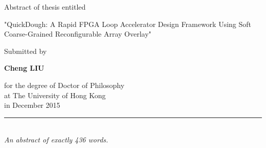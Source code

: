 
\begin{center}
\small Abstract of thesis entitled

\LARGE "QuickDough: A Rapid FPGA Loop Accelerator Design Framework Using Soft Coarse-Grained
Reconfigurable Array Overlay"

\vspace{5mm}
\small Submitted by 

\large \textbf{Cheng LIU}

\vspace{5mm}
for the degree of Doctor of Philosophy \\
at The University of Hong Kong \\
in December 2015 \\

\vspace{5mm}
\end{center}


\begin{center}
\rule{60mm}{0.4pt} \\
\emph{An abstract of exactly 436 words.}
\end{center}

\pagebreak
